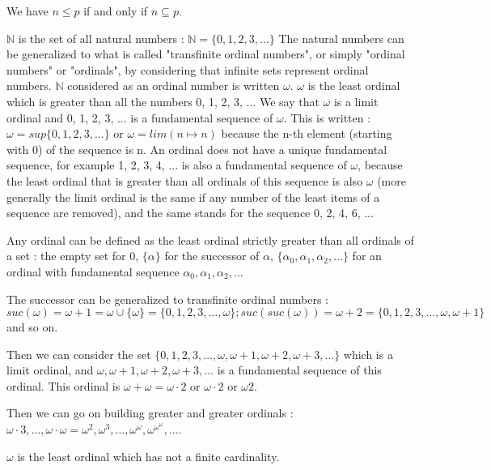 \documentclass[10pt]{article}
\begin{document}
We have \( n \leq p \) if and only if \( n \subseteq p \).

\( \mathbb{N} \) is the set of all natural numbers : \( \mathbb{N} = \lbrace0,1,2,3,\ldots\rbrace \)
The natural numbers can be generalized to what is called "transfinite ordinal numbers", or simply "ordinal numbers" or "ordinals", by considering that infinite sets represent ordinal numbers. \( \mathbb{N} \) considered as an ordinal number is written \( \omega \).
\( \omega \) is the least ordinal which is greater than all the numbers 0, 1, 2, 3, ... We say that \( \omega \) is a limit ordinal and 0, 1, 2, 3, ... is a fundamental sequence of \( \omega \). This is written : \( \omega = sup \lbrace 0, 1, 2, 3, ... \rbrace \) or \( \omega = lim ( n \mapsto n )  \) because the n-th element (starting with 0) of the sequence is n. An ordinal does not have a unique fundamental sequence, for example 1, 2, 3, 4, ... is also a fundamental sequence of \( \omega \), because the least ordinal that is greater than all ordinals of this sequence is also \( \omega \) (more generally the limit ordinal is the same if any number of the least items of a sequence are removed), and the same stands for the sequence 0, 2, 4, 6, ...

Any ordinal can be defined as the least ordinal strictly greater than all ordinals of a set : the empty set for 0, \(\lbrace \alpha \rbrace\) for the successor of \( \alpha \),  \(\lbrace \alpha_0,\alpha_1,\alpha_2,...\rbrace\) for an ordinal with fundamental sequence \(\alpha_0, \alpha_1, \alpha_2, ...\)

The successor can be generalized to transfinite ordinal numbers : \( suc(\omega) = \omega+1 =\omega \cup \lbrace \omega \rbrace = \lbrace 0, 1, 2, 3, \ldots, \omega \rbrace ; suc(suc(\omega)) = \omega+2 = \lbrace 0, 1, 2, 3, \ldots, \omega, \omega+1 \rbrace \) and so on.

Then we can consider the set \( \lbrace 0, 1, 2, 3, \ldots, \omega, \omega+1, \omega+2, \omega+3, \ldots \rbrace \) which is a limit ordinal, and \( \omega, \omega+1, \omega+2, \omega+3, \ldots \) is a fundamental sequence of this ordinal. This ordinal is \( \omega+\omega = \omega \cdot 2 \) or \( \omega \cdot 2 \) or \( \omega 2 \).

Then we can go on building greater and greater ordinals : \( \omega \cdot 3, \ldots, \omega \cdot \omega = \omega^2, \omega^3, \ldots, \omega^\omega, \omega^{\omega^\omega}, \ldots \).

\bigskip

\( \omega \) is the least ordinal which has not a finite cardinality. 
\end{document}
